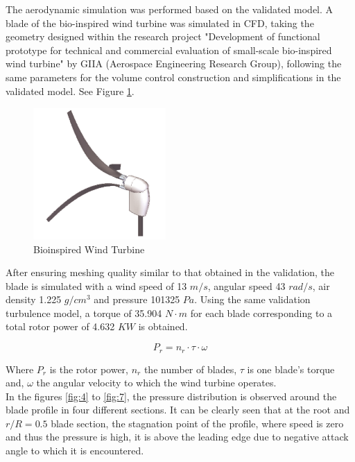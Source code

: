 The aerodynamic simulation was performed based on the validated model. A blade of the bio-inspired wind turbine was simulated in CFD, taking the geometry designed within the research project "Development of functional prototype for technical and commercial evaluation of small-scale bio-inspired wind turbine" by GIIA (Aerospace Engineering Research Group), following the same parameters for the volume control construction and simplifications in the validated model. See Figure \ref{fig:3}.
\begin{figure}[H]
\begin{center}
  \includegraphics[width=0.45\textwidth]{Rotor}%
\caption{Bioinspired Wind Turbine}
\label{fig:3}
\end{center}       %
\end{figure}
After ensuring meshing quality similar to that obtained in the validation,  the blade is simulated with a wind speed of 13 $m/s$, angular speed 43 $rad/s$, air density 1.225 $g/cm^3$ and pressure 101325 $Pa$. Using the same validation turbulence model, a torque of 35.904 $N\cdot m$ for each blade corresponding to a total rotor power of 4.632 $KW$ is obtained.

\begin{equation}
P_r = n_r\cdot \tau\cdot \omega
\end{equation}

Where $P_r$ is the rotor power,  $n_r$ the number of blades,  $\tau$ is one blade’s torque and, $\omega$ the angular velocity to which the wind turbine operates. \\ 

In the figures \ref{fig:4} to \ref{fig:7}, the pressure distribution is observed around the blade profile in four different sections. It can be clearly seen that at the root and $r/R= 0.5$ blade section, the stagnation point of the profile, where speed is zero and thus the pressure is high, it is above the leading edge due to negative attack angle to which it is encountered.

